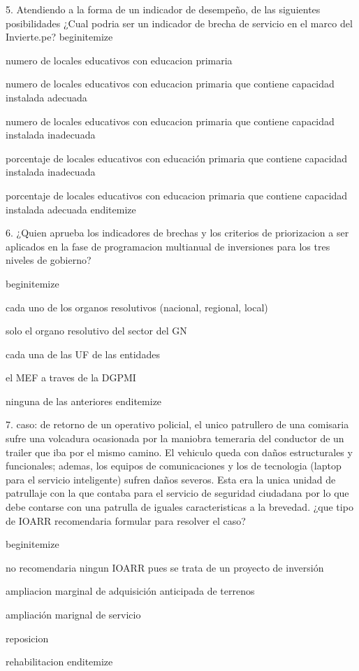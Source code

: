 5. Atendiendo a la forma de un indicador de desempeño, de las siguientes posibilidades ¿Cual podria ser un indicador de brecha de servicio en el marco del Invierte.pe?
begin{itemize}
			\item numero de locales educativos con educacion primaria
 			\item numero de locales educativos con educacion primaria que contiene capacidad instalada adecuada
			\item numero de locales educativos con educacion primaria que contiene capacidad instalada inadecuada
			\item  porcentaje de locales educativos con educación primaria que contiene capacidad instalada inadecuada
			\item porcentaje de locales educativos con educacion primaria que contiene capacidad instalada adecuada
end{itemize}

6. ¿Quien aprueba los indicadores de brechas y los criterios de priorizacion a ser aplicados en la fase de programacion multianual de inversiones para los tres niveles de gobierno?

begin{itemize}
			\item cada uno de los organos resolutivos (nacional, regional, local)
 			\item solo el organo resolutivo del sector del GN
			\item cada una de las UF de las entidades
			\item el MEF a traves de la DGPMI
			\item ninguna de las  anteriores 
end{itemize}

7. caso: de retorno de un operativo policial, el unico patrullero de una comisaria sufre una volcadura ocasionada por la maniobra temeraria del conductor de un trailer que iba por el mismo camino. El vehiculo queda con daños estructurales y funcionales; ademas, los equipos de comunicaciones y los de tecnologia (laptop para el servicio inteligente) sufren daños severos. Esta era la unica unidad de patrullaje con la que contaba para el servicio de seguridad ciudadana por lo que debe contarse con una patrulla de iguales caracteristicas a la brevedad. ¿que tipo de IOARR recomendaria formular para resolver el  caso?

begin{itemize}
			\item no recomendaria ningun IOARR pues se trata de un proyecto de inversión 
 			\item ampliacion marginal de adquisición anticipada de terrenos
			\item ampliación marignal de servicio 
			\item reposicion
			\item rehabilitacion
end{itemize}

